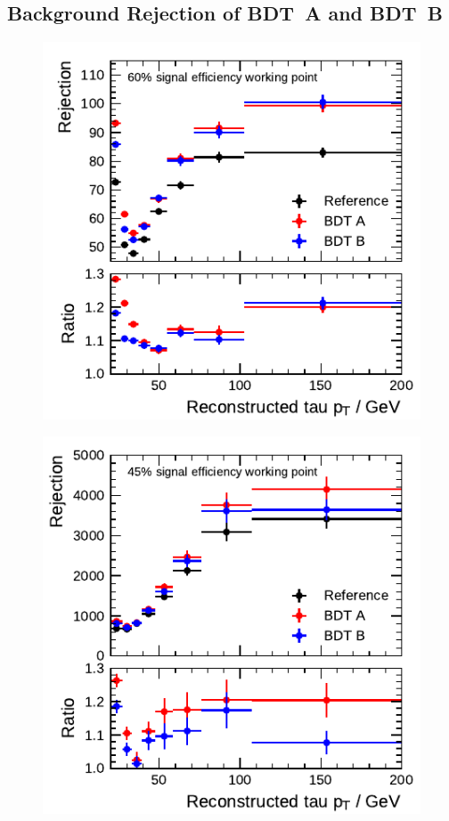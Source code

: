 \FloatBarrier
\subsection{Background Rejection of BDT~A and BDT~B}

\noindent
\begin{minipage}{\textwidth}
  \captionsetup{type=figure}
  \begin{subfigure}[t]{0.48\textwidth}
    \centering
    \includegraphics{./figures/bdt_perf/rejection/post_gridsearch_1p/rejection_tight.pdf}
  \end{subfigure}\hfill
  \begin{subfigure}[t]{0.48\textwidth}
    \centering
    \includegraphics{./figures/bdt_perf/rejection/post_gridsearch_3p/rejection_tight.pdf}

\end{subfigure}
\end{minipage}
